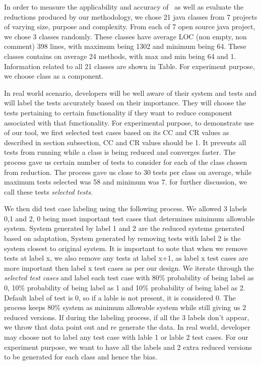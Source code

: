 In order to measure the applicability and accuracy of \mytool\, as well as evaluate the reductions produced by our methodology, we chose 21 java classes from 7 projects of varying size, purpose and complexity. From each of 7 open source java project, we chose 3 classes randomly. These classes have average LOC (non empty, non comment) 398 lines, with maximum being 1302 and minimum being 64. These classes contains on average 24 methods, with max and min being 64 and 1. Information related to all 21 classes are shown in Table. For experiment purpose, we choose class as a component. 

In real world scenario, developers will be well aware of their system and tests and will label the tests accurately based on their importance. They will choose the tests pertaining to certain functionality if they want to reduce component associated with that functionality.  For experimental purpose, to demonstrate use of our tool, we first selected test cases based on its CC and CR values as described in section subsection, CC and CR values should be 1. It prevents all tests from running while a class is being reduced and converges faster. The process gave us certain number of tests to consider for each of the class chosen from reduction. The process gave us close to 30 tests per class on average, while maximum tests selected was 58 and minimum was 7. for further discussion, we call these tests \emph{selected tests}. 

We then did test case labeling using the following process. We allowed 3 labels 0,1 and 2, 0 being most important test cases that determines minimum allowable system. System generated by label 1 and 2 are the reduced systems generated based on adaptation, System generated by removing tests with label 2 is the system closest to original system. It is important to note that when we remove tests at label x, we also remove any tests at label x+1, as label x test cases are more important then label x test cases as per our design. We iterate through the \emph{selected test cases} and label each test case with 80\% probability of being label as 0, 10\% probability of being label as 1 and 10\% probability of being label as 2. Default label of test is 0, so if a lable is not present, it is considered 0. The process keeps 80\% system as minimum allowable system while still giving us 2 reduced versions. If during the labeling process, if all the 3 labels don't appear, we throw that data point out and re generate the data. In real world, developer may choose not to label any test case with lable 1 or lable 2 test cases. For our experiment purpose, we want to have all the labels and 2 extra reduced versions to be generated for each class and hence the bias. 

